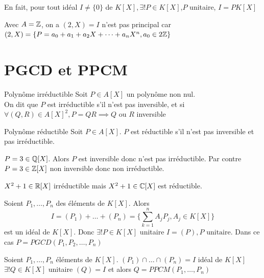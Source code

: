 \documentclass[]{report}
\begin{document}
    \begin{re}{}{}
        En fait, pour tout idéal $I\neq\{0\}$ de $K[X],\exists!P\in K[X]$,$P$ unitaire, \tq $I=P K[X]$
    \end{re}

    \begin{ex}{}{}
        Avec $A=\mathbb{Z}$, on a $(2,X)=I$ n'est pas principal car $(2,X)=\{P=a_0+a_1+a_2X+\dots+a_nX^n,a_0\in 2\mathbb{Z}\}$
    \end{ex}

    \section{PGCD et PPCM}

    \begin{df}{Polynôme irréductible}{}
        Soit $P\in A[X]$ un polynôme non nul.\\
        On dit que $P$ est irréductible s'il n'est pas inversible, et si \\$\forall(Q,R)\in A[X]^2,P=QR\implies Q$ ou $R$ inversible
    \end{df}

    \begin{df}{Polynôme réductible}{}
        Soit $P\in A[X]$. $P$ est réductible s'il n'est pas inversible et pas irréductible.
    \end{df}

    \begin{ex}{}{}
        $P=3\in \mathbb{Q}[X]$. Alors $P$ est inversible donc n'est pas irréductible. Par contre $P=3\in \mathbb{Z}[X]$ non inversible donc non irréductible.
    \end{ex}

    \begin{ex}{}{}
        $X^2+1\in\mathbb{R}[X]$ irréductible mais $X^2+1\in\mathbb{C}[X]$ est réductible.
    \end{ex}

    \begin{df}{}{}
        Soient $P_1,\dots,P_n$ des éléments de $K[X]$. Alors 
        \[I=(P_1)+\dots+(P_n)=\{\sum_{k=1}^nA_jP_j,A_j\in K[X]\}\]
        est un idéal de $K[X]$. Donc $\exists!P\in K[X]$ unitaire \tq $I=(P), P\text{ unitaire}$. Dans ce cas $P=PGCD(P_1,P_2,\dots,P_n)$
    \end{df}

    \begin{df}{}{}
        Soient $P_1,\dots,P_n$ éléments de $K[X]$. $(P_1)\cap\dots\cap(P_n)=I$ idéal de $K[X]$\\
        $\exists! Q \in K[X]$ unitaire \tq $(Q)=I$ et alors $Q=PPCM(P_1,\dots,P_n)$
    \end{df}
\end{document}
